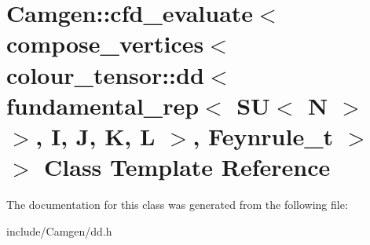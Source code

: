 \hypertarget{a00059}{\section{Camgen\-:\-:cfd\-\_\-evaluate$<$ compose\-\_\-vertices$<$ colour\-\_\-tensor\-:\-:dd$<$ fundamental\-\_\-rep$<$ S\-U$<$ N $>$ $>$, I, J, K, L $>$, Feynrule\-\_\-t $>$ $>$ Class Template Reference}
\label{a00059}
}


The documentation for this class was generated from the following file\-:\begin{DoxyCompactItemize}
\item 
include/\-Camgen/dd.\-h\end{DoxyCompactItemize}
